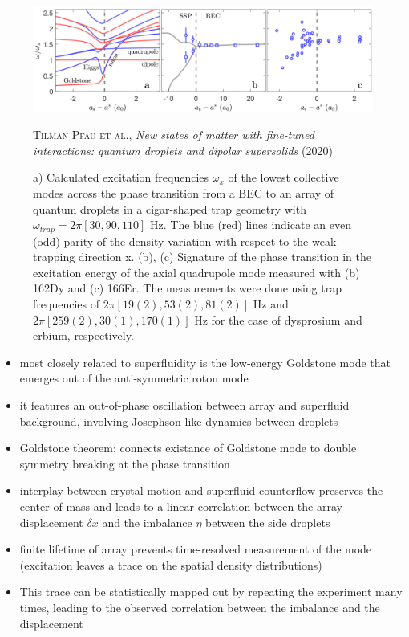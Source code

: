\begin{figure}[H]
    \centering
    \includegraphics[width=1.0\textwidth]{IMAGE/collective_modes.png}\\
    \caption{
      a) Calculated excitation frequencies $\omega_{x}$ of the lowest collective modes across the phase transition from a BEC to an array of quantum droplets in
a cigar-shaped trap geometry with $\omega_{trap} = 2\pi [30, 90, 110]$ Hz.
The blue (red) lines
indicate an even (odd) parity of the density variation with respect to the weak
trapping direction x.
(b), (c) Signature of the phase transition in the excitation
energy of the axial quadrupole mode measured with (b)
162Dy and (c) 166Er.
The measurements were done using trap frequencies of $2 \pi [19(2), 53(2), 81(2)]$ Hz
and $2 \pi [259(2), 30(1), 170(1)]$ Hz for the case of dysprosium and erbium, respectively.
      }
    \textsc{Tilman Pfau et al.}, \emph{New states of matter with fine-tuned interactions: quantum droplets and dipolar supersolids} (2020)
    \label{fig:collective_modes}
\end{figure}

\begin{itemize}
    \item most closely related to superfluidity is the low-energy Goldstone mode that emerges out of the anti-symmetric roton mode
    \item it features an out-of-phase oscillation between array and superfluid background, involving Josephson-like dynamics between droplets
    \item Goldstone theorem: connects existance of Goldstone mode to double symmetry breaking at the phase transition
    \item interplay between crystal motion and superfluid counterflow preserves the center of mass and leads to a linear correlation between the array displacement $\delta x$ and the imbalance $\eta$ between the side droplets
    \item finite lifetime of array prevents time-resolved measurement of the mode (excitation leaves a trace
        on the spatial density distributions)
    \item This trace can be statistically mapped out by repeating the experiment many times, leading to the observed correlation between the imbalance and the displacement
\end{itemize}


